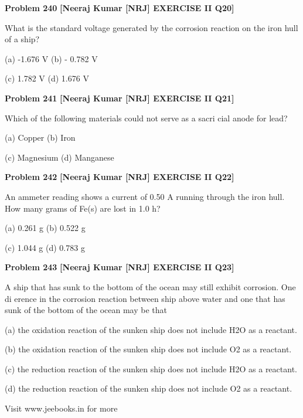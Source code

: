 \begin{problembox}
\textbf{Problem 240} \hfill \textbf{[Neeraj Kumar [NRJ] EXERCISE II Q20]}
\label{q:ext-nrj_all_questions-240}

What is the standard voltage generated by the 
corrosion reaction on the iron hull of a ship?
 
 (a) -1.676 V 
(b) - 0.782 V
 
 (c) 1.782 V 
(d) 1.676 V
\end{problembox}

\begin{problembox}
\textbf{Problem 241} \hfill \textbf{[Neeraj Kumar [NRJ] EXERCISE II Q21]}
\label{q:ext-nrj_all_questions-241}

Which of the following materials could not serve 
as a sacri  cial anode for lead?
 
 (a) Copper 
(b) Iron
 
 (c) Magnesium 
(d) Manganese
\end{problembox}

\begin{problembox}
\textbf{Problem 242} \hfill \textbf{[Neeraj Kumar [NRJ] EXERCISE II Q22]}
\label{q:ext-nrj_all_questions-242}

An ammeter reading shows a current of 0.50 A 
running through the iron hull. How many grams 
of Fe(s) are lost in 1.0 h?
 
 (a) 0.261 g 
(b) 0.522 g
 
 (c) 1.044 g 
(d) 0.783 g
\end{problembox}

\begin{problembox}
\textbf{Problem 243} \hfill \textbf{[Neeraj Kumar [NRJ] EXERCISE II Q23]}
\label{q:ext-nrj_all_questions-243}

A ship that has sunk to the bottom of the ocean may 
still exhibit corrosion. One di  erence in the corrosion 
reaction between ship above water and one that has 
sunk of the bottom of the ocean may be that
 
 (a)  the oxidation reaction of the sunken ship does 
not include H2O as a  reactant.
 
 (b)  the oxidation reaction of the sunken ship does 
not include O2 as a  reactant.
 
 (c)  the reduction reaction of the sunken ship does 
not include H2O as a  reactant.
 
 (d)  the reduction reaction of the sunken ship does 
not include O2 as a  reactant.
 
 
Visit www.jeebooks.in for more
\end{problembox}

